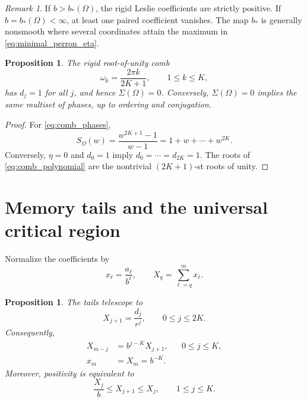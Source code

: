 \documentclass[11pt]{amsart}
\numberwithin{equation}{section}
\theoremstyle{plain}
\newtheorem{proposition}[theorem]{Proposition}
\theoremstyle{definition}
\theoremstyle{remark}
\newtheorem{remark}[theorem]{Remark}
\begin{document}
\begin{remark}
\label{rem:minimal_perron_boundary}
If $b>b_*(\Omega)$, the rigid Leslie coefficients are strictly positive.  If $b=b_*(\Omega)<\infty$, at least one paired coefficient vanishes.  The map $b_*$ is generally nonsmooth where several coordinates attain the maximum in \eqref{eq:minimal_perron_eta}.
\end{remark}

\begin{proposition}
\label{prop:comb_zero_strain}
The rigid root-of-unity comb
\begin{equation}
\omega_k=\frac{2\pi k}{2K+1},
\qquad 1\leq k\leq K,
\label{eq:comb_phases}
\end{equation}
has $d_j=1$ for all $j$, and hence $\Sigma(\Omega)=0$.  Conversely, $\Sigma(\Omega)=0$ implies the same multiset of phases, up to ordering and conjugation.
\end{proposition}

\begin{proof}
For \eqref{eq:comb_phases},
\begin{equation}
S_\Omega(w)=\frac{w^{2K+1}-1}{w-1}
=1+w+\cdots+w^{2K}.
\label{eq:comb_polynomial}
\end{equation}
Conversely, $\eta=0$ and $d_0=1$ imply $d_0=\cdots=d_{2K}=1$.  The roots of \eqref{eq:comb_polynomial} are the nontrivial $(2K+1)$-st roots of unity.
\end{proof}

\section{Memory tails and the universal critical region}
\label{sec:memory_critical_region}

Normalize the coefficients by
\begin{equation}
x_\ell=\frac{a_\ell}{b^\ell},
\qquad
X_q=\sum_{\ell=q}^{m}x_\ell.
\label{eq:memory_tail_definition}
\end{equation}

\begin{proposition}
\label{prop:memory_tail_formula}
The tails telescope to
\begin{equation}
X_{j+1}=\frac{d_j}{r^j},
\qquad 0\leq j\leq2K.
\label{eq:memory_tail_formula}
\end{equation}
Consequently,
\begin{align}
X_{m-j}&=b^{j-K}X_{j+1},
&&0\leq j\leq K,
\label{eq:tail_palindromy}\\
x_m&=X_m=b^{-K}.
\label{eq:last_memory_mass}
\end{align}
Moreover, positivity is equivalent to
\begin{equation}
\frac{X_j}{b}\leq X_{j+1}\leq X_j,
\qquad 1\leq j\leq K.
\label{eq:tail_inequalities}
\end{equation}
\end{proposition}
\end{document}
